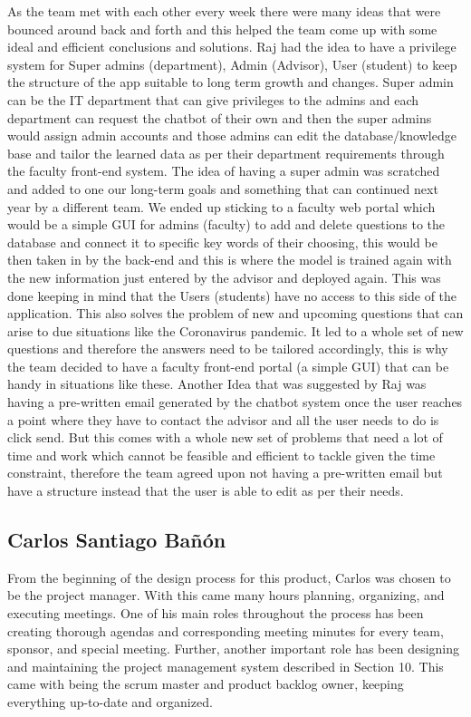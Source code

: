 \documentclass[titlepage, 12pt]{article}
\begin{document}
As the team met with each other every week there were many ideas that were bounced around back and forth and this helped the team come up with some ideal and efficient conclusions and solutions. Raj had the idea to have a privilege system for Super admins (department), Admin (Advisor), User (student) to keep the structure of the app suitable to long term growth and changes. Super admin can be the IT department that can give privileges to the admins and each department can request the chatbot of their own and then the super admins would assign admin accounts and those admins can edit the database/knowledge base and tailor the learned data as per their department requirements through the faculty front-end system. The idea of having a super admin was scratched and added to one our long-term goals and something that can continued next year by a different team. We ended up sticking to a faculty web portal which would be a simple GUI for admins (faculty) to add and delete questions to the database and connect it to specific key words of their choosing, this would be then taken in by the back-end and this is where the model is trained again with the new information just entered by the advisor and deployed again. This was done keeping in mind that the Users (students) have no access to this side of the application. This also solves the problem of new and upcoming questions that can arise to due situations like the Coronavirus pandemic. It led to a whole set of new questions and therefore the answers need to be tailored accordingly, this is why the team decided to have a faculty front-end portal (a simple GUI) that can be handy in situations like these. Another Idea that was suggested by Raj was having a pre-written email generated by the chatbot system once the user reaches a point where they have to contact the advisor and all the user needs to do is click send. But this comes with a whole new set of problems that need a lot of time and work which cannot be feasible and efficient to tackle given the time constraint, therefore the team agreed upon not having a pre-written email but have a structure instead that the user is able to edit as per their needs.

\subsection{Carlos Santiago Bañón}

From the beginning of the design process for this product, Carlos was chosen to be the project manager. With this came many hours planning, organizing, and executing meetings. One of his main roles throughout the process has been creating thorough agendas and corresponding meeting minutes for every team, sponsor, and special meeting. Further, another important role has been designing and maintaining the project management system described in Section 10. This came with being the scrum master and product backlog owner, keeping everything up-to-date and organized.
\end{document}
